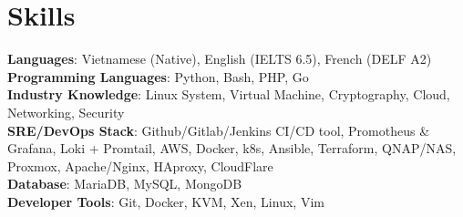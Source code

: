 \documentclass[letterpaper,11pt]{article}
\makeatletter
\newcommand{\resumeSubheading}[4]{
  \vspace{-2pt}\item
  \begin{tabular*}{0.97\textwidth}[t]{l@{\extracolsep{\fill}}r}
      \textbf{#1} & #2 \\
      \textit{\small#3} & \textit{\small #4} \\
    \end{tabular*}\vspace{-7pt}
}
\newcommand{\resumeSubHeadingListStart}{\begin{itemize}[leftmargin=0.15in, label={}]}
\newcommand{\resumeSubHeadingListEnd}{\end{itemize}}
\makeatother
\begin{document}

  
%
\section{Skills}
 \begin{itemize}[leftmargin=0.15in, label={}]
    {\item{
        \textbf{Languages}{: Vietnamese (Native), English (IELTS 6.5), French (DELF A2) }\\
        \textbf{Programming Languages}{: Python, Bash, PHP, Go} \\
        \textbf{Industry Knowledge}{: Linux System, Virtual Machine, Cryptography, Cloud, Networking, Security}\\
        \textbf{SRE/DevOps Stack}{: Github/Gitlab/Jenkins CI/CD tool, Promotheus \& Grafana, Loki + Promtail, AWS, Docker, k8s, Ansible, Terraform, QNAP/NAS, Proxmox, Apache/Nginx, HAproxy, CloudFlare}\\
        \textbf{Database}{: MariaDB, MySQL, MongoDB}\\
        \textbf{Developer Tools}{: Git, Docker, KVM, Xen, Linux, Vim} \\

    }}
 \end{itemize}
\end{document}
